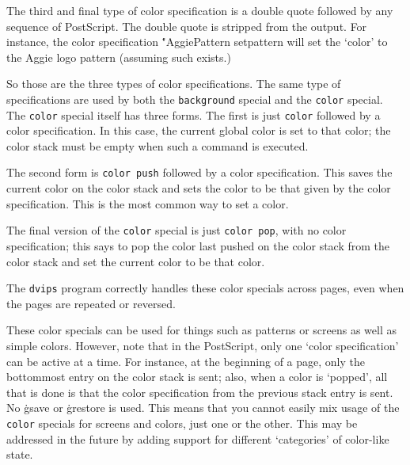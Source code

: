 The third and final type of color specification is a double quote followed
by any sequence of PostScript.	The double quote is stripped from the
output.  For instance, the color specification \.{"AggiePattern setpattern}
will set the `color' to the Aggie logo pattern (assuming such exists.)

So those are the three types of color specifications.  The same type of
specifications are used by both the {\tt background} special and the
{\tt color} special.  The {\tt color} special itself has three forms.
The first is just {\tt color} followed by a color specification.  In
this case, the current global color is set to that color; the color stack
must be empty when such a command is executed.

The second form is {\tt color push} followed by a color specification.
This saves the current color on the color stack and sets the color
to be that given by the color specification.  This is the most common
way to set a color.

The final version of the {\tt color} special is just {\tt color pop},
with no color specification; this says to pop the color last pushed
on the color stack from the color stack and set the current color to
be that color.

The {\tt dvips} program correctly handles these color specials
across pages, even when the pages are repeated or reversed.

These color specials can be used for things such as patterns or
screens as well as simple colors.  However, note that in the
PostScript, only one `color specification' can be active at a
time.  For instance, at the beginning of a page, only the
bottommost entry on the color stack is sent; also, when a color
is `popped', all that is done is that the color specification
from the previous stack entry is sent.	No \.{gsave} or \.{grestore}
is used.  This means that you cannot easily mix usage of the
{\tt color} specials for screens and colors, just one or the other.
This may be addressed in the future by adding support for
different `categories' of color-like state.

\bye
